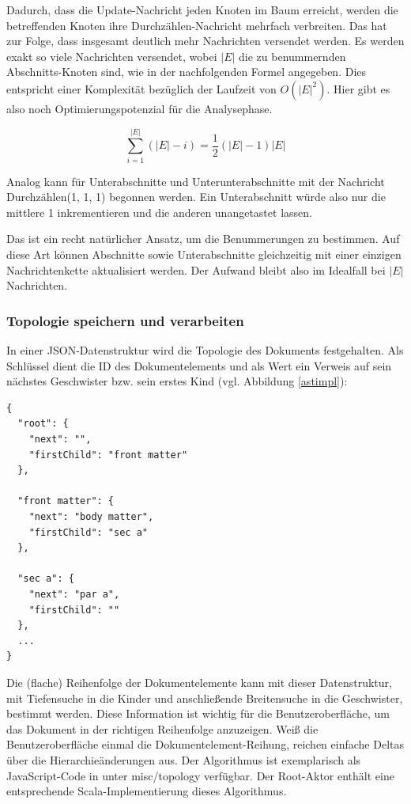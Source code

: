  
Dadurch, dass die Update-Nachricht jeden Knoten im Baum erreicht, werden die betreffenden Knoten ihre Durchzählen-Nachricht mehrfach verbreiten. Das hat zur Folge, dass insgesamt deutlich mehr Nachrichten versendet werden. Es werden exakt so viele Nachrichten versendet, wobei \(|E|\) die zu benummernden Abschnitts-Knoten sind, wie in der nachfolgenden Formel angegeben. Dies entspricht einer Komplexität bezüglich der Laufzeit von \(O(|E|^2)\). Hier gibt es also noch Optimierungspotenzial für die Analysephase.

 
$$\sum_{i=1}^{|E|}{\left( |E|-i \right)}=\frac{1}{2}\left( |E|-1 \right)|E|$$
 
Analog kann für Unterabschnitte und Unterunterabschnitte mit der Nachricht Durchzählen(1, 1, 1) begonnen werden. Ein Unterabschnitt würde also nur die mittlere 1 inkrementieren und die anderen unangetastet lassen.

 
Das ist ein recht natürlicher Ansatz, um die Benummerungen zu bestimmen. Auf diese Art können Abschnitte sowie Unterabschnitte gleichzeitig mit einer einzigen Nachrichtenkette aktualisiert werden. Der Aufwand bleibt also im Idealfall bei \(|E|\) Nachrichten.

 
\subsubsection{Topologie speichern und verarbeiten}\label{}

 
In einer JSON-Datenstruktur wird die Topologie des Dokuments festgehalten. Als Schlüssel dient die ID des Dokumentelements und als Wert ein Verweis auf sein nächstes Geschwister bzw. sein erstes Kind (vgl. Abbildung \ref{astimpl}):

 
\begin{verbatim}
{
  "root": {
    "next": "",
    "firstChild": "front matter"
  },

  "front matter": {
    "next": "body matter",
    "firstChild": "sec a"
  },

  "sec a": {
    "next": "par a",
    "firstChild": ""
  },
  ...
}
\end{verbatim}
 
Die (flache) Reihenfolge der Dokumentelemente kann mit dieser Datenstruktur, mit Tiefensuche in die Kinder und anschließende Breitensuche in die Geschwister, bestimmt werden. Diese Information ist wichtig für die Benutzeroberfläche, um das Dokument in der richtigen Reihenfolge anzuzeigen. Weiß die Benutzeroberfläche einmal die Dokumentelement-Reihung, reichen einfache Deltas über die Hierarchieänderungen aus. Der Algorithmus ist exemplarisch als JavaScript-Code in \citep{HodappScaltex} unter misc/topology verfügbar. Der Root-Aktor enthält eine entsprechende Scala-Implementierung dieses Algorithmus.

